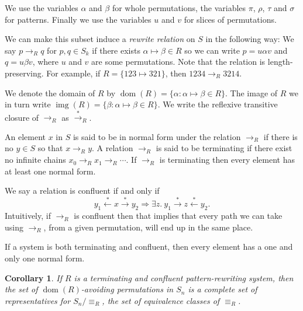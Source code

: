 \documentclass[openany, a4paper, 11pt, english]{article}
\newcommand{\breath}{\vspace{6pt plus 2pt minus 1pt}\noindent}
\newcommand{\patternrule}{ \mapsto \!}
\newtheorem{corollary}[theorem]{Corollary}
\theoremstyle{definition}
\newcommand{\Sym}{S}
\newcommand{\from}{\leftarrow}
\newcommand{\tostar}{\stackrel{*}{\to}}
\newcommand{\fromstar}{\stackrel{*}{\from}}
\DeclareMathOperator{\dom}{dom}
\DeclareMathOperator{\img}{img}
\begin{document}
We use the variables $\alpha$ and $\beta$ for whole permutations, 
the variables $\pi$, $\rho$, $\tau$ and $\sigma$ for patterns.
Finally we use the variables $u$ and $v$ for slices of permutations.

We can make this subset induce a \emph{rewrite relation} on $\Sym$ in the following way: We say
$p \to_R q$ for $p, q \in \Sym_k$ if there exists $\alpha \patternrule \beta \in R$ so
we can write $p = u \alpha v$ and $q = u \beta v$, where
$u$ and $v$ are some permutations.  Note that the relation is
length-preserving. For example, if $R = \{123 \patternrule 321\}$, then $1234 \to_R 3214$. 

\breath We denote the domain of $R$ by $\dom(R) = \{\alpha : \alpha \patternrule
\beta \in R\}$. The image of $R$ we in turn write $\img(R) = \{\beta : \alpha
\patternrule \beta \in R\}$. We write the reflexive transitive closure of
$\to_R$ as $\tostar_R$. 

An element $x$ in $\Sym$ is said to be in normal form under the relation $\to_R$
if there is no $y \in \Sym$ so that $x \to_R y$. A relation $\to_R$ is said to be
terminating if there exist no infinite chains $x_0 \to_R x_1 \to_R \cdots$. If
$\to_R$ is terminating then every element has at least one normal form. 

We say a relation is confluent if and only if
$$
    y_1 \fromstar x \tostar y_2 \Longrightarrow 
    \exists z. \  y_1 \tostar z \fromstar y_2.
$$
Intuitively, if $\to_R$ is confluent then that implies that every path we can
take using $\to_R$, from a given permutation, will end up in the same place. 

If a system is both terminating and confluent, then every element has a one and
only one normal form.

\begin{corollary}
    If $R$ is a terminating and confluent pattern-rewriting system, then the set
    of $\dom(R)$-avoiding permutations in $S_n$ is a complete set of
    representatives for $S_n / \equiv_R$, the set of equivalence classes of
    $\equiv_R$.
\end{corollary}
\end{document}

